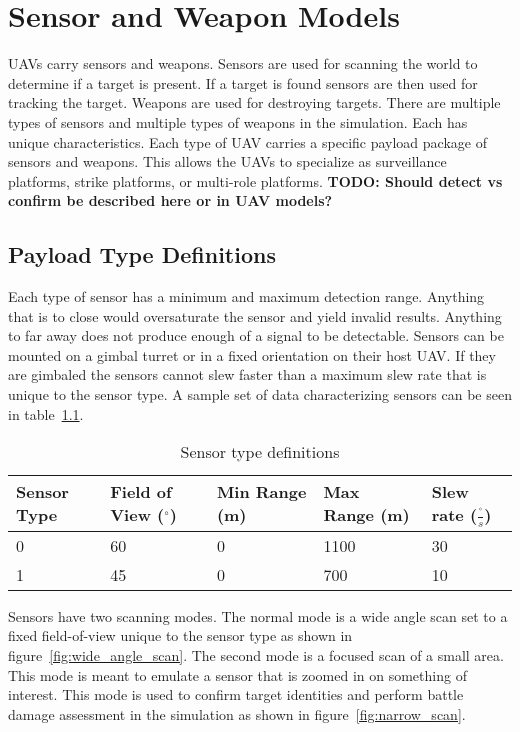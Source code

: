 \chapter{Sensor and Weapon Models}
UAVs carry sensors and weapons.  Sensors are used for scanning the world to determine if a target is present.  If a target is found sensors are then used for tracking the target.  Weapons are used for destroying targets.  There are multiple types of sensors and multiple types of weapons in the simulation.  Each has unique characteristics.  Each type of UAV carries a specific payload package of sensors and weapons.  This allows the UAVs to specialize as surveillance platforms, strike platforms, or multi-role platforms. \textbf{TODO: Should detect vs confirm be described here or in UAV models?}

\section{Payload Type Definitions}

Each type of sensor has a minimum and maximum detection range.  Anything that is to close would oversaturate the sensor and yield invalid results.  Anything to far away does not produce enough of a signal to be detectable.  Sensors can be mounted on a gimbal turret or in a fixed orientation on their host UAV.  If they are gimbaled the sensors cannot slew faster than a maximum slew rate that is unique to the sensor type. A sample set of data characterizing sensors can be seen in table~\ref{tab:sensorType}.

\begin{table}[H]
	\caption{Sensor type definitions}
	\centering
	\label{tab:sensorType}
	\begin{tabular}{|p{1cm}|p{1.5cm}|p{1cm}|p{1cm}|p{1.5cm}|}
		\hline
		Sensor Type & Field of View ($^{\circ}$) & Min Range (m) & Max Range (m) & Slew rate ($\frac{^{\circ}}{s}$)\\ \hline
		0 & 60 & 0 & 1100 & 30 \\
		1 & 45 & 0 & 700  & 10 \\
		\hline
	\end{tabular}
\end{table}

Sensors have two scanning modes.  The normal mode is a wide angle scan set to a fixed field-of-view unique to the sensor type as shown in figure~\ref{fig:wide_angle_scan}.  The second mode is a focused scan of a small area.  This mode is meant to emulate a sensor that is zoomed in on something of interest.  This mode is used to confirm target identities and perform battle damage assessment in the simulation as shown in figure~\ref{fig:narrow_scan}.


